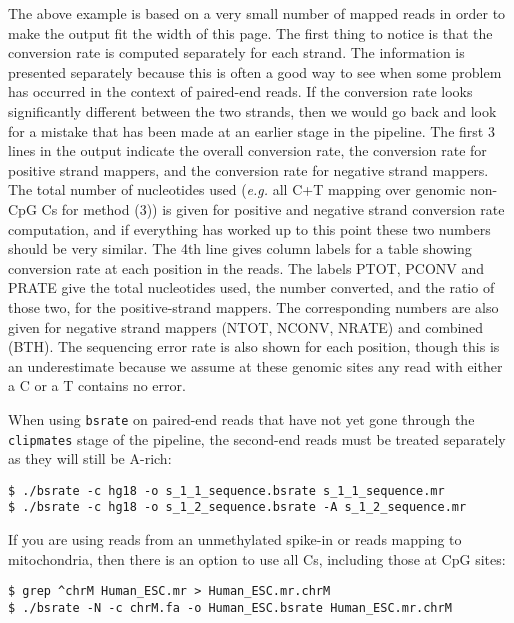 \documentclass[10pt]{article}
\newcommand{\prog}[1]{\texttt{#1}}
\begin{document}
\noindent
The above example is based on a very small number of mapped reads in
order to make the output fit the width of this page.  The first thing
to notice is that the conversion rate is computed separately for each
strand. The information is presented separately because this is often
a good way to see when some problem has occurred in the context of
paired-end reads. If the conversion rate looks significantly different
between the two strands, then we would go back and look for a mistake
that has been made at an earlier stage in the pipeline. The first 3
lines in the output indicate the overall conversion rate, the
conversion rate for positive strand mappers, and the conversion rate
for negative strand mappers. The total number of nucleotides used
({\em e.g.} all C+T mapping over genomic non-CpG Cs for method (3)) is
given for positive and negative strand conversion rate computation,
and if everything has worked up to this point these two numbers should
be very similar. The 4th line gives column labels for a table showing
conversion rate at each position in the reads.  The labels PTOT, PCONV
and PRATE give the total nucleotides used, the number converted, and
the ratio of those two, for the positive-strand mappers. The
corresponding numbers are also given for negative strand mappers
(NTOT, NCONV, NRATE) and combined (BTH). The sequencing error rate is
also shown for each position, though this is an underestimate because
we assume at these genomic sites any read with either a C or a T
contains no error.

When using \prog{bsrate} on paired-end reads that have not yet gone
through the \prog{clipmates} stage of the pipeline, the second-end
reads must be treated separately as they will still be A-rich:
\begin{verbatim}
$ ./bsrate -c hg18 -o s_1_1_sequence.bsrate s_1_1_sequence.mr
$ ./bsrate -c hg18 -o s_1_2_sequence.bsrate -A s_1_2_sequence.mr
\end{verbatim}
If you are using reads from an unmethylated spike-in or reads mapping
to mitochondria, then there is an option to use all Cs, including those
at CpG sites:
\begin{verbatim}
$ grep ^chrM Human_ESC.mr > Human_ESC.mr.chrM
$ ./bsrate -N -c chrM.fa -o Human_ESC.bsrate Human_ESC.mr.chrM
\end{verbatim}

\end{document}
